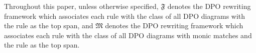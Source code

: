 


Throughout this paper, unless otherwise specified, 
\(\mathfrak{F}\) denotes the DPO rewriting framework which associates each rule with the class of all DPO diagrams with the rule as the top span, and \(\mathfrak{M}\) denotes the DPO rewriting framework which associates each rule with the class of all DPO diagrams with monic matches and the rule as the top span.